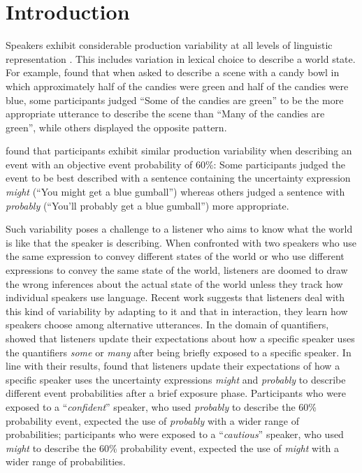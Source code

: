 \section{Introduction}

Speakers exhibit considerable production variability at all levels 
of linguistic representation . This includes 
variation in lexical choice to describe a world state. For example, \cite{Yildirim2016} found that 
when asked to describe a scene with a candy bowl in which approximately half of the candies were green
and half of the candies were blue, some participants judged ``Some of the candies are green'' to be the more appropriate
utterance to describe the scene than ``Many of the candies are green'', while others displayed the opposite pattern. 


\cite{Schuster2018} found that participants exhibit similar production variability when describing 
an event with an objective event probability of 60\%: Some participants judged the event to be
best described with a sentence containing the uncertainty expression \textit{might} (``You might get a blue gumball'') 
whereas others judged a sentence with \textit{probably} (``You'll probably get a blue gumball'') more
appropriate.

Such variability poses a challenge to a listener who aims to know what the world is like that the speaker is describing. 
When confronted with two speakers who use the same expression to convey different states of the world or
who use different expressions to convey the same state of the world, listeners are doomed to draw the 
wrong inferences about the actual state of the world unless they track how individual speakers use language.
Recent work suggests that listeners deal with this kind of variability by adapting to it 
 and 
that in interaction, they learn how speakers choose among alternative 
utterances. In the domain of quantifiers,  
\textcite{Yildirim2016} showed that listeners update their expectations about how a specific speaker uses the quantifiers 
\textit{some} or \textit{many} after being briefly exposed to a specific speaker. 
In line with their results, \textcite{Schuster2018} found that listeners update their expectations of how a specific speaker
uses the uncertainty expressions \textit{might} and \textit{probably} to describe different event probabilities after a brief
exposure phase. Participants who were exposed to a ``\textit{confident}'' speaker, who used \textit{probably} to describe the 60\% probability event, 
 expected the use of \textit{probably} with a wider range of probabilities; participants who were exposed to a ``\textit{cautious}'' speaker, who
used \textit{might} to describe the 60\% probability event, expected the use of \textit{might} with a wider range of probabilities.


